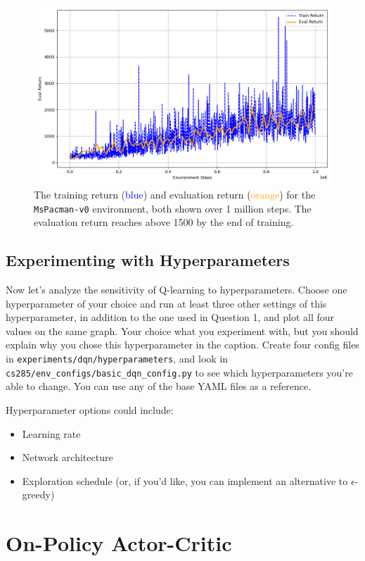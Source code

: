 \documentclass{article}
\begin{document}
\begin{figure}[H]
  \centering
  \includegraphics[width=0.8\linewidth]{imgs/hw3_double_dqn_MsPacman_Plotonce.png}
  \caption{The training return (\textcolor{blue}{blue}) and evaluation return (\textcolor{orange}{orange}) for the \texttt{MsPacman-v0} environment, both shown over 1 million steps. The evaluation return reaches above 1500 by the end of training.}
  \label{fig:double_dqn_mspacman}
\end{figure}

\subsection{Experimenting with Hyperparameters} Now let's analyze the sensitivity of Q-learning to hyperparameters. Choose one hyperparameter of your choice and run at least three other settings of this hyperparameter, in addition to the one used in Question 1, and plot all four values on the same graph. Your choice what you experiment with, but you should explain why you chose this hyperparameter in the caption. Create four config files in \verb|experiments/dqn/hyperparameters|, and look in \verb|cs285/env_configs/basic_dqn_config.py| to see which hyperparameters you're able to change. You can use any of the base YAML files as a reference.

Hyperparameter options could include:
\begin{itemize}
    \item Learning rate
    \item Network architecture
    \item Exploration schedule (or, if you'd like, you can implement an alternative to $\epsilon$-greedy)
\end{itemize}




\section{On-Policy Actor-Critic}
\end{document}
